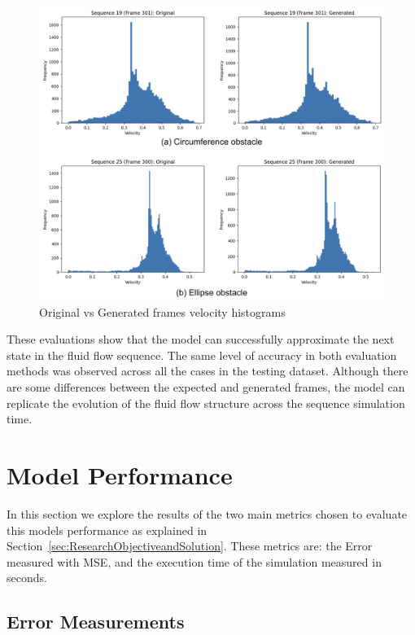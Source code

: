 \begin{figure}[!htbp]
    \centering
    \includegraphics[width=1\linewidth]{images/generated_histogram.png}
    \caption{Original vs Generated frames velocity histograms}
    \label{fig:GeneratedHistograms}
\end{figure}


These evaluations show that the model can successfully approximate the next state in the fluid flow sequence. The same level of accuracy in both evaluation methods was observed across all the cases in the testing dataset. Although there are some differences between the expected and generated frames, the model can replicate the evolution of the fluid flow structure across the sequence simulation time.

\section{Model Performance}
\label{sec:ModelPerformance}

In this section we explore the results of the two main metrics chosen to evaluate this models performance as explained in Section~\ref{sec:ResearchObjectiveandSolution}. These metrics are: the Error measured with MSE, and the execution time of the simulation measured in seconds.

\subsection{Error Measurements}
\label{subsec:ErrorMeasurements}

